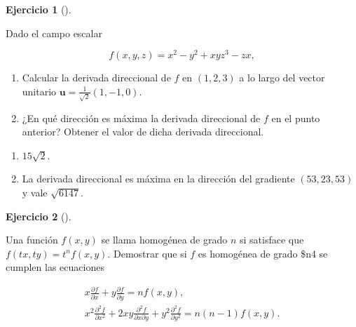 \documentclass[
  a4paper,
]{scrreport}
\theoremstyle{definition}
\newtheorem{exercise}{Ejercicio}[chapter]
\theoremstyle{remark}
\begin{document}
\begin{exercise}[]\protect\hypertarget{exr-derivada-direccional-3}{}\label{exr-derivada-direccional-3}

Dado el campo escalar

\[
f(x,y,z) = x^2-y^2+xyz^3-zx,
\]

\begin{enumerate}
\def\labelenumi{\alph{enumi}.}
\item
  Calcular la derivada direccional de \(f\) en \((1,2,3)\) a lo largo
  del vector unitario \(\mathbf{u}=\frac{1}{\sqrt2}(1,-1,0)\).
\item
  ¿En qué dirección es máxima la derivada direccional de \(f\) en el
  punto anterior? Obtener el valor de dicha derivada direccional.
\end{enumerate}

\end{exercise}

\begin{tcolorbox}[enhanced jigsaw, bottomrule=.15mm, breakable, colframe=quarto-callout-tip-color-frame, toprule=.15mm, opacityback=0, left=2mm, opacitybacktitle=0.6, colback=white, toptitle=1mm, titlerule=0mm, bottomtitle=1mm, arc=.35mm, title=\textcolor{quarto-callout-tip-color}{\faLightbulb}\hspace{0.5em}{Solución}, rightrule=.15mm, colbacktitle=quarto-callout-tip-color!10!white, leftrule=.75mm, coltitle=black]

\begin{enumerate}
\def\labelenumi{\alph{enumi}.}
\item
  \(15\sqrt{2}\).
\item
  La derivada direccional es máxima en la dirección del gradiente
  \((53,23,53)\) y vale \(\sqrt{6147}\).
\end{enumerate}

\end{tcolorbox}

\begin{exercise}[]\protect\hypertarget{exr-funcion-homogenea}{}\label{exr-funcion-homogenea}

Una función \(f(x,y)\) se llama homogénea de grado \(n\) si satisface
que \(f(tx, ty) = t^nf(x,y)\). Demostrar que si \(f\) es homogénea de
grado \$n4 se cumplen las ecuaciones

\[
\begin{gathered}
x\frac{\partial f}{\partial x} + y \frac{\partial f}{\partial y} = nf(x,y),\\
x^2\frac{\partial^2 f}{\partial x^2} + 2xy \frac{\partial^2 f}{\partial x \partial y} + y^2 \frac{\partial^2 f}{\partial y^2} = n(n-1)f(x,y).
\end{gathered}
\]

\end{exercise}
\end{document}
